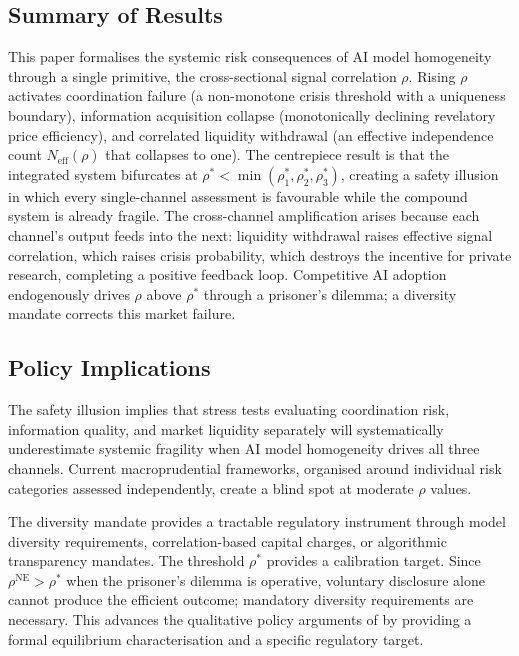 \label{sec:conclusion}

\subsection{Summary of Results}

This paper formalises the systemic risk consequences of AI model homogeneity through a single primitive, the cross-sectional signal correlation $\rho$. Rising $\rho$ activates coordination failure (a non-monotone crisis threshold with a uniqueness boundary), information acquisition collapse (monotonically declining revelatory price efficiency), and correlated liquidity withdrawal (an effective independence count $N_{\text{eff}}(\rho)$ that collapses to one). The centrepiece result is that the integrated system bifurcates at $\rho^* < \min(\rho_1^*, \rho_2^*, \rho_3^*)$, creating a safety illusion in which every single-channel assessment is favourable while the compound system is already fragile. The cross-channel amplification arises because each channel's output feeds into the next: liquidity withdrawal raises effective signal correlation, which raises crisis probability, which destroys the incentive for private research, completing a positive feedback loop. Competitive AI adoption endogenously drives $\rho$ above $\rho^*$ through a prisoner's dilemma; a diversity mandate corrects this market failure.

\subsection{Policy Implications}

The safety illusion implies that stress tests evaluating coordination risk, information quality, and market liquidity separately will systematically underestimate systemic fragility when AI model homogeneity drives all three channels. Current macroprudential frameworks, organised around individual risk categories assessed independently, create a blind spot at moderate $\rho$ values.

The diversity mandate provides a tractable regulatory instrument through model diversity requirements, correlation-based capital charges, or algorithmic transparency mandates. The threshold $\rho^*$ provides a calibration target. Since $\rho^{\text{NE}} > \rho^*$ when the prisoner's dilemma is operative, voluntary disclosure alone cannot produce the efficient outcome; mandatory diversity requirements are necessary. This advances the qualitative policy arguments of \citet{danielsson2022} by providing a formal equilibrium characterisation and a specific regulatory target.

